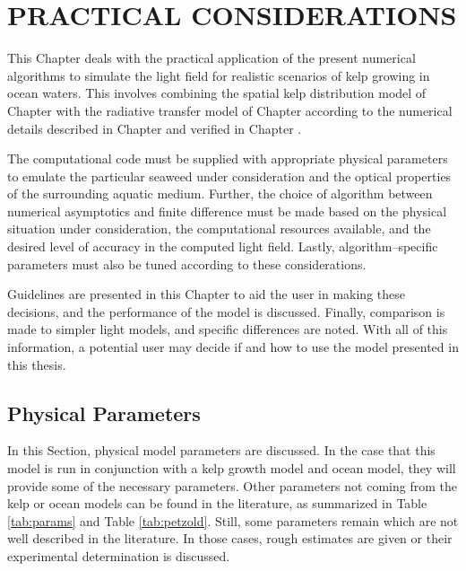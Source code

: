 \chapter{PRACTICAL CONSIDERATIONS}
\label{chap:application}

This Chapter deals with the practical application of the present numerical algorithms to simulate the light field for realistic scenarios of kelp growing in ocean waters.
This involves combining the spatial kelp distribution model of Chapter \Rom{\ref{chap:kelp}} with the radiative transfer model of Chapter \Rom{\ref{chap:light}} according to the numerical details described in Chapter \Rom{\ref{chap:numerical}} and verified in Chapter \Rom{\ref{chap:model_analysis}}.

The computational code must be supplied with appropriate physical parameters to emulate the particular seaweed under consideration and the optical properties of the surrounding aquatic medium.
Further, the choice of algorithm between numerical asymptotics and finite difference must be made based on the physical situation under consideration, the computational resources available, and the desired level of accuracy in the computed light field.
Lastly, algorithm--specific parameters must also be tuned according to these considerations.

Guidelines are presented in this Chapter to aid the user in making these decisions, and the performance of the model is discussed.
Finally, comparison is made to simpler light models, and specific differences are noted.
With all of this information, a potential user may decide if and how to use the model presented in this thesis.

\section{Physical Parameters}
\label{sec:parameters}
In this Section, physical model parameters are discussed.
In the case that this model is run in conjunction with a kelp growth model and ocean model,
they will provide some of the necessary parameters.
Other parameters not coming from the kelp or ocean models can be found in the literature,
as summarized in Table \ref{tab:params} and Table \ref{tab:petzold}.
Still, some parameters remain which are not well described in the literature.
In those cases, rough estimates are given or their experimental determination is discussed.

